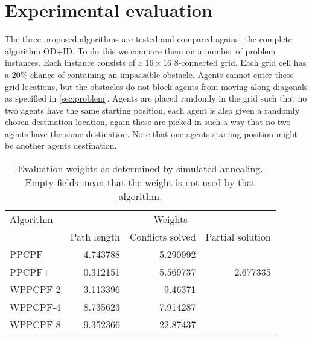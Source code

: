 \section{Experimental evaluation}\label{sec:results}

The three proposed algorithms are tested and compared against the complete
algorithm OD+ID. To do this we compare them on a number of problem instances.
Each instance consists of a $16 \times 16$ 8-connected grid. Each grid cell has
a $20\%$ chance of containing an impassable obstacle. Agents cannot enter these
grid locations, but the obstacles do not block agents from moving along
diagonals as specified in \autoref{sec:problem}. Agents are placed randomly in
the grid such that no two agents have the same starting position, each agent is
also given a randomly chosen destination location, again these are picked in
such a way that no two agents have the same destination. Note that one agents
starting position might be another agents destination.

\begin{table}[t]
	\centering
	\caption{Evaluation weights as determined by simulated annealing. Empty
	fields mean that the weight is not used by that algorithm.}
	\label{tbl:annealing}
	\begin{tabular}{l|r|r|r}
		Algorithm & \multicolumn{3}{c}{Weights} \\ \cline{2-4}
		& Path length & Conflicts solved & Partial solution \\ \hline
		PPCPF     & 4.743788 & 5.290992 &  \\
		PPCPF+    & 0.312151 & 5.569737 & 2.677335 \\
		WPPCPF-2 & 3.113396 & 9.46371 &  \\
		WPPCPF-4 & 8.735623 & 7.914287 &  \\
		WPPCPF-8 & 9.352366 & 22.87437 &
	\end{tabular}
\end{table}

